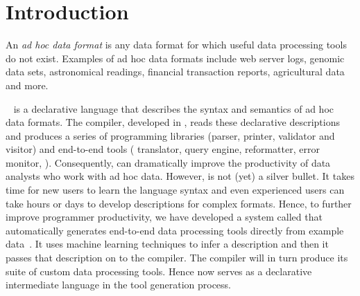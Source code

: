 \section{Introduction}\label{sec:intro}



An {\em ad hoc data format} is any data format for which useful data processing
tools do not exist.  Examples of ad hoc data formats include web server logs,
genomic data sets, astronomical readings, financial transaction reports, 
agricultural data and more.  

\pads~\cite{fisher+:pads,padsweb} is a declarative 
language that describes the syntax and semantics of ad hoc data
formats.  The \pads{} compiler, developed in \ml{},
reads these declarative descriptions
and produces a series of programming libraries (parser, printer, validator
and visitor) and end-to-end tools (\xml{} translator, query engine, reformatter,
error monitor, \etc{}).  Consequently, \pads{} can
dramatically improve the  
productivity of data analysts who work with ad hoc data.
However, \pads{} is not (yet) a silver bullet.  It takes time for new users
to learn the language syntax and even experienced users can take hours or 
days to develop descriptions for complex formats.  Hence, to further improve
programmer productivity, we have developed a system 
called \learnpads{} that automatically generates end-to-end data
processing tools directly from example 
data~\cite{fisher+:dirttoshovels,fisher+:sigmod08}.  
It uses machine learning techniques to infer 
a \pads{} description and then it passes that description on to the
\pads{} compiler.  The compiler will in turn produce its suite of 
custom data processing tools.  Hence \pads{} now serves as a declarative
intermediate language in the tool generation process.

